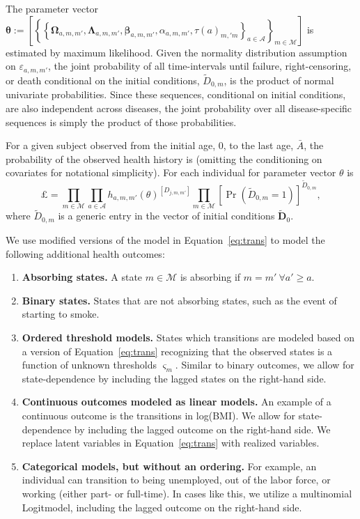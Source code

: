 \noindent The parameter vector $\bm{\theta} := \left[ \left\{ \left\{  \bm{\Omega}_{a,m,m'}, \bm{\Lambda}_{a,m,m'}, \bm{\beta}_{a,m,m'}, \alpha_{a,m,m'}, \tau \left( a \right) _{m,'m}  \right\}_{a \in \mathcal{A}} \right\}_{m \in \mathcal{M}} \right]$ is estimated by maximum likelihood. Given the normality distribution assumption on $\varepsilon_{a,m,m'}$, the joint probability of all time-intervals until failure, right-censoring, or death conditional on the initial conditions, $\tilde{D}_{0,m}$, is the product of normal univariate probabilities. Since these sequences, conditional on initial conditions, are also independent across diseases, the joint probability over all disease-specific sequences is simply the product of those probabilities.

\noindent For a given subject observed from the initial age, $0$, to the last age, $\bar{A}$, the probability of the observed health history is (omitting the conditioning on covariates for notational simplicity). For each individual for parameter vector $\theta$ is
\begin{equation}
\mathsterling = \prod_{m \in \mathcal{M}} \prod_{a \in \mathcal{A}} {h_{a,m,m'}(\theta)}^{[D_{j,m,m'}]} \prod_{m \in \mathcal{M}}{[\Pr (\tilde{D}_{0,m}=1)]}^{\tilde{D}_{0,m}}, 
\end{equation}
\noindent where $\tilde{D}_{0,m}$ is a generic entry in the vector of initial conditions $\tilde{\bm{D}}_0$. 

We use modified versions of the model in Equation~\eqref{eq:trans} to model the following additional health outcomes: 

\begin{enumerate}
\item \textbf{Absorbing states.} A state $m \in \mathcal{M}$ is absorbing if $m = m'  \ \forall a' \geq a$.
\item \textbf{Binary states.} States that are not absorbing states, such as the event of starting to smoke.
\item \textbf{Ordered threshold models.} States which transitions are modeled based on a version of Equation~\eqref{eq:trans} recognizing that the observed states is a function of unknown thresholds $\varsigma_m$. Similar to binary outcomes, we allow for state-dependence by including the lagged states on the right-hand side.
\item \textbf{Continuous outcomes modeled as linear models.} An example of a continuous outcome is the
transitions in log(BMI). We allow for state-dependence by including the lagged outcome on the right-hand side. We replace latent variables in Equation~\eqref{eq:trans} with realized variables.
\item \textbf{Categorical models, but without an ordering.} For example, an individual can transition
to being unemployed, out of the labor force, or working (either part- or full-time). In cases like this, we utilize
a multinomial Logitmodel, including the lagged outcome on the right-hand side.
\end{enumerate}

